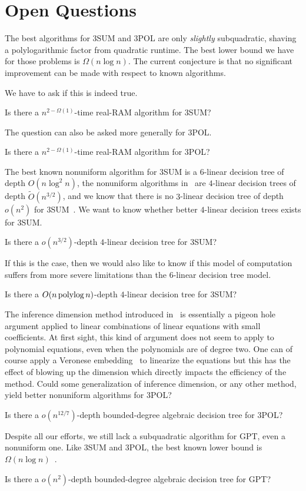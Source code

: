 \section{Open Questions}

The best algorithms for 3SUM and 3POL are only \emph{slightly} subquadratic,
shaving a polylogarithmic factor from quadratic runtime. The best lower bound
we have for those problems is \(\Omega(n \log n)\). The current conjecture is that
no significant improvement can be made with respect to known algorithms.
\ConjectureSUM*

We have to ask if this is indeed true.
\begin{openquestion}
	Is there a \(n^{2-\Omega(1)}\)-time real-RAM algorithm for 3SUM?
\end{openquestion}

The question can also be asked more generally for 3POL.
\begin{openquestion}
	Is there a \(n^{2-\Omega(1)}\)-time real-RAM algorithm for 3POL?
\end{openquestion}

The best known nonuniform algorithm for 3SUM is a \(6\)-linear decision tree of
depth \(O(n \log^2 n)\), the nonuniform algorithms in~\cite{GP18,Fr15,GS15} are
\(4\)-linear decision trees of depth \( \tilde{O}(n^{3/2}) \), and we know that
there is no \(3\)-linear decision tree of depth \(o(n^2)\) for
3SUM~\cite{Er99a}.
We want to know whether better \(4\)-linear decision trees exists for 3SUM.
\begin{openquestion}
	Is there a \(o(n^{3/2})\)-depth \(4\)-linear decision tree for 3SUM?
\end{openquestion}

If this is the case, then we would also like to know if this model of
computation suffers from more severe limitations than the \(6\)-linear decision tree
model.
\begin{openquestion}
	Is there a \(O(n \operatorname{polylog} n)\)-depth \(4\)-linear decision tree for 3SUM?
\end{openquestion}

The inference dimension method introduced in~\cite{KLM18} is essentially a
pigeon hole argument applied to linear combinations of linear equations with small coefficients.
At first sight, this kind of argument does not seem to apply to polynomial
equations, even when the polynomials are of degree two. One can of course apply
a Veronese embedding~\cite{Har77,Har13} to linearize the equations but this has
the effect of blowing up the dimension which directly impacts the efficiency of
the method. Could some generalization of inference dimension, or any other
method, yield better nonuniform algorithms for 3POL?
\begin{openquestion}
	Is there a \(o(n^{12/7})\)-depth bounded-degree algebraic decision tree for
	3POL?
\end{openquestion}

Despite all our efforts, we still lack a subquadratic algorithm for GPT, even a
nonuniform one. Like 3SUM and 3POL, the best known lower bound is \(\Omega(n
\log n)\)~\cite{???}.
\begin{openquestion}
	Is there a \(o(n^2)\)-depth bounded-degree algebraic decision tree for
	GPT?
\end{openquestion}
